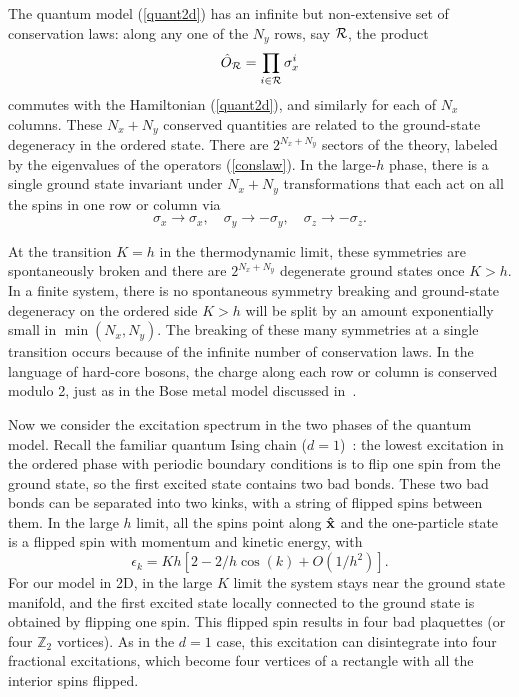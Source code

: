 \documentclass[prl,twocolumn,showpacs,superscriptaddress,preprintnumbers,amssymb]{revtex4}
\newcommand{\beq}{\begin{equation}}
\newcommand{\eeq}{\end{equation}}
\begin{document}

The quantum model (\ref{quant2d}) has an infinite but non-extensive set of conservation
laws: along any one of the $N_y$ rows, say ${\cal R}$, the product
\beq
{\hat O}_{\cal R} = \prod_{i \in {\cal R}} \sigma^i_x
\label{conslaw}
\eeq
commutes with the Hamiltonian (\ref{quant2d}), and similarly for each of $N_x$ columns.  These $N_x+N_y$ conserved quantities are related to the ground-state degeneracy in the ordered state.  There are $2^{N_x+N_y}$ sectors of the theory, labeled by the eigenvalues of the operators (\ref{conslaw}).  In the large-$h$ phase, there is
a single ground state invariant under $N_x+N_y$ transformations that each act on all the spins in one row or column via
\beq
\sigma_x \rightarrow \sigma_x, \quad \sigma_y \rightarrow -\sigma_y, \quad \sigma_z \rightarrow -\sigma_z.
\eeq

At the transition $K=h$ in the thermodynamic limit, these symmetries are spontaneously broken and there are $2^{N_x+N_y}$ degenerate ground states once $K>h$.  In a finite system, there is no spontaneous symmetry breaking and ground-state degeneracy on the ordered side $K>h$ will be split by an amount exponentially small in $\min(N_x,N_y)$.  The breaking of these many symmetries at a single transition occurs because of the infinite number of conservation laws.  In the language of hard-core bosons, the charge
along each row or column is conserved modulo 2, just as in the
Bose metal model discussed in~\cite{paramekanti}.

Now we consider the excitation spectrum in the two phases of the
quantum model.  Recall the familiar quantum Ising
chain ($d=1$)~\cite{sachdev}: the lowest excitation in the
ordered phase with periodic boundary conditions is to flip one
spin from the ground state, so the first excited state contains
two bad bonds. These two bad bonds can be separated into two
kinks, with a string of flipped spins between them.  In the large
$h$ limit, all the spins point along ${\bf \hat x}$ and the
one-particle state is a flipped spin with momentum
and kinetic energy, with \beq \epsilon_k = K h\left[2-2/h\cos(k)+O(1/h^2)\right].
\label{dispersion}\eeq For our model in 2D, in the large $K$ limit
the system stays near the ground state manifold, and the first
excited state locally connected to the ground state
is obtained by flipping one spin. This flipped spin
results in four bad plaquettes (or four $\mathbb{Z}_2$
vortices).  As in the $d=1$ case, this excitation can
disintegrate into four fractional excitations, which become four
vertices of a rectangle with all the interior spins flipped.
\end{document}

